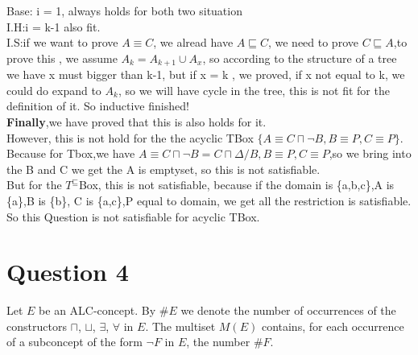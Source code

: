 \documentclass{article}
\begin{document}
    Base: i = 1, always holds for both two situation\\
    I.H:i = k-1 also fit.\\
    I.S:if we want to prove $A \equiv C$, we alread have $A \sqsubseteq C$, we need to prove $C \sqsubseteq A$,to prove this , we assume $A_k = A_{k+1} \cup A_x$, so according to the structure of a tree we have x must bigger than 
    k-1, but if x = k , we proved, if x not equal to k, we could do expand to $A_k$, so we will have cycle in the tree, this is not fit for the definition of it. So inductive finished!\\
    \textbf{Finally},we have proved that this is also holds for it.\\



    However, this is not hold for the the acyclic TBox $\{A\equiv C\sqcap\neg B, B\equiv P, C\equiv P\}$.\\
    Because for Tbox,we have $A \equiv C\sqcap\neg B = C\sqcap\Delta /B, B \equiv P,C\equiv P$,so we bring into the B and C we get the A is emptyset, so this is not satisfiable.\\
    But for the $T^{\sqsubseteq}$Box, this is not satisfiable, because if the domain is \{a,b,c\},A is \{a\},B is \{b\}, C is \{a,c\},P equal to domain, we get all the restriction is satisfiable.\\
    So this Question is not satisfiable for acyclic TBox.

    \section{Question 4}
    Let $E$ be an ALC-concept. By $\#E$ we denote the number of occurrences of the constructors $\sqcap$, $\sqcup$, $\exists$, $\forall$ in $E$. The multiset $M(E)$ contains, for each occurrence of a subconcept of the form $\neg F$ in $E$, the number $\#F$.
    
\end{document}

